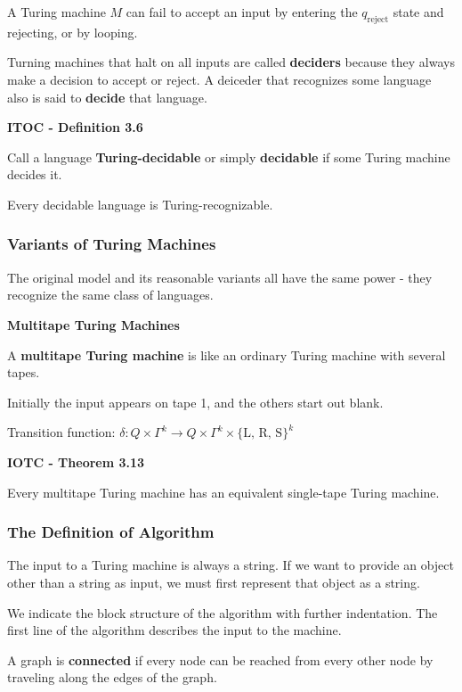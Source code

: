A Turing machine $M$ can fail to accept an input by entering the $q_\text{reject}$ state and rejecting, or by looping.

Turning machines that halt on all inputs are called \textbf{deciders} because they always make a decision to accept or reject. A deiceder that recognizes some language also is said to \textbf{decide} that language.

\begin{shaded}
\textbf{ITOC - Definition 3.6}

\medskip
Call a language \textbf{Turing-decidable} or simply \textbf{decidable} if some Turing machine decides it.
\end{shaded}

{\color{blue} Every decidable language is Turing-recognizable.}

\subsubsection{Variants of Turing Machines}

The original model and its reasonable variants all have the same power - they recognize the same class of languages.

\medskip
\textbf{Multitape Turing Machines}

A \textbf{multitape Turing machine} is like an ordinary Turing machine with several tapes.

Initially the input appears on tape 1, and the others start out blank.

Transition function: $\delta: Q \times \Gamma^k \rightarrow Q \times \Gamma^k \times \{\text{L, R, S}\}^k$

\begin{shaded}
\textbf{IOTC - Theorem 3.13}

\medskip
Every multitape Turing machine has an equivalent single-tape Turing machine.
\end{shaded}

\subsubsection{The Definition of Algorithm}

The input to a Turing machine is always a string. If we want to provide an object other than a string as input, we must first represent that object as a string.

We indicate the block structure of the algorithm with further indentation. The first line of the algorithm describes the input to the machine.

A graph is \textbf{connected} if every node can be reached from every other node by traveling along the edges of the graph.
